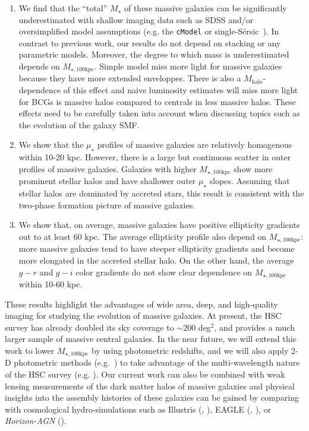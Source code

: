 \documentclass[a4paper,fleqn,usenatbib]{mnras}
\def\ser{{S\'{e}rsic\ }}
\def\mstar{{$M_{\star}$}}
\def\mhalo{{$M_{\mathrm{halo}}$}}
\def\mtot{{$M_{\star,100\mathrm{kpc}}$}}
\def\mden{{$\mu_{\star}$}}
\begin{document}
    \begin{enumerate}
        \item We find that the ``total'' \mstar{} of these massive galaxies can be 
            significantly underestimated with shallow imaging data such as SDSS and/or 
            oversimplified model assumptions (e.g. the \texttt{cModel} or single-\ser{}). 
            In contrast to previous work, our results do not depend on stacking or any 
            parametric models. 
            Moreover, the degree to which mass is underestimated depends on \mtot{}. Simple model miss more light for massive galaxies because they have more extended enveloppes. There is also a \mhalo{}-dependence of this effect and naive luminosity estimates will  miss more light for BCGs is massive halos compared to centrals in less massive halos. These effects need to be carefully taken into account when discussing topics such as the evolution of the galaxy SMF.     
        \item We show that the \mden{} profiles of massive galaxies are relatively homogenous  within 10-20 kpc. However, there is a large but continuous scatter in outer profiles of massive galaxies. Galaxies with higher \mtot{} show more prominent stellar halos and have 
            shallower outer \mden{} slopes. 
            Assuming that stellar halos are dominated by accreted stars, this result is consistent with the two-phase formation picture of massive galaxies. 
        \item We show that, on average, massive galaxies have positive ellipticity 
            gradients out to at least 60 kpc. 
            The average ellipticity profile also depend on \mtot{}: more massive 
            galaxies tend to have steeper ellipticity gradients and become more 
            elongated in the accreted stellar halo. 
            On the other hand, the average $g-r$ and $g-i$ color gradients do not 
            show clear dependence on \mtot{} within 10-60 kpc.      
    \end{enumerate}

    These results highlight the advantages of wide area, deep, and high-quality imaging 
    for studying the evolution of massive galaxies. 
    At present, the HSC survey has already doubled its sky coverage to 
    ${\sim} 200$ deg$^2$, and provides a much larger sample of massive central galaxies. 
    In the near future, we will extend this work to lower \mtot{} by using photometric 
    redshifts, and we will also apply 2-D photometric methods (e.g.\ \citealt{Huang2013a}) 
    to take advantage of the multi-wavelength nature of the HSC survey 
    (e.g. \citealt{Huang2016}). 
    Our current work can also be combined with weak lensing measurements of the dark 
    matter halos of massive galaxies and physical insights into the assembly histories 
    of these galaxies can be gained by comparing with cosmological hydro-simulations 
    such as Illustris (\citealt{Vogelsberger2014}, \citealt{Genel2014}), 
    EAGLE (\citealt{Schaye2015}, \citealt{Crain2015}), or \textit{Horizon-AGN} 
    (\citealt{Dubois2014}).
\end{document}
